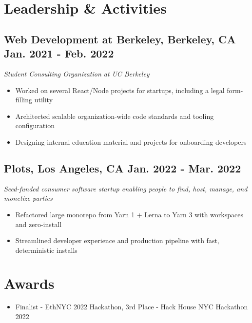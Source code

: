 \documentclass{article}
\begin{document}
	\section{Leadership \& Activities}

	\subsection{
		\textbf{Web Development at Berkeley}, Berkeley, CA
		{\hspace{\fill}\bfseries Jan. 2021 - Feb. 2022}
	}
	{\itshape Student Consulting Organization at UC Berkeley}
	\begin{itemize}
		\item Worked on several React/Node projects for startups, including a legal form-filling utility
		\item Architected scalable organization-wide code standards and tooling configuration
		\item Designing internal education material and projects for onboarding developers
	\end{itemize}

	\vspace{14pt}

	\subsection{
		\textbf{Plots}, Los Angeles, CA
		{\hspace{\fill}\bfseries Jan. 2022 - Mar. 2022}
	}
	{\itshape Seed-funded consumer software startup enabling people to find, host, manage, and monetize parties}
    \begin{itemize}
		\item Refactored large monorepo from Yarn 1 + Lerna to Yarn 3 with workspaces and zero-install
		\item Streamlined developer experience and production pipeline with fast, deterministic installs
	\end{itemize}

	\section{Awards}
	\vspace{3pt}
	\begin{itemize}
		\item Finalist - EthNYC 2022 Hackathon, 3rd Place - Hack House NYC Hackathon 2022
	\end{itemize}
\end{document}
